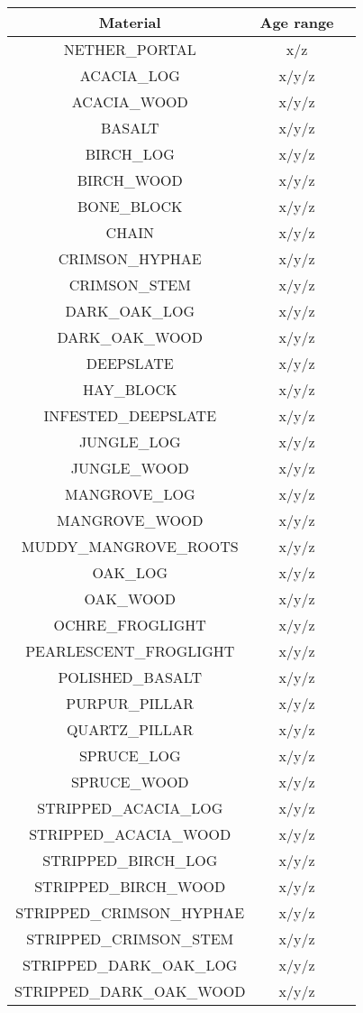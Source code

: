 \documentclass[11pt]{article}
\begin{document}
\begin{longtable}{ |c|c|c| }
	\hline
	Material & Age range \\
	\hline
	\endhead
	NETHER\_PORTAL & x/z \\
	ACACIA\_LOG & x/y/z \\
	ACACIA\_WOOD & x/y/z \\
	BASALT & x/y/z \\
	BIRCH\_LOG & x/y/z \\
	BIRCH\_WOOD & x/y/z \\
	BONE\_BLOCK & x/y/z \\
	CHAIN & x/y/z \\
	CRIMSON\_HYPHAE & x/y/z \\
	CRIMSON\_STEM & x/y/z \\
	DARK\_OAK\_LOG & x/y/z \\
	DARK\_OAK\_WOOD & x/y/z \\
	DEEPSLATE & x/y/z \\
	HAY\_BLOCK & x/y/z \\
	INFESTED\_DEEPSLATE & x/y/z \\
	JUNGLE\_LOG & x/y/z \\
	JUNGLE\_WOOD & x/y/z \\
	MANGROVE\_LOG & x/y/z \\
	MANGROVE\_WOOD & x/y/z \\
	MUDDY\_MANGROVE\_ROOTS & x/y/z \\
	OAK\_LOG & x/y/z \\
	OAK\_WOOD & x/y/z \\
	OCHRE\_FROGLIGHT & x/y/z \\
	PEARLESCENT\_FROGLIGHT & x/y/z \\
	POLISHED\_BASALT & x/y/z \\
	PURPUR\_PILLAR & x/y/z \\
	QUARTZ\_PILLAR & x/y/z \\
	SPRUCE\_LOG & x/y/z \\
	SPRUCE\_WOOD & x/y/z \\
	STRIPPED\_ACACIA\_LOG & x/y/z \\
	STRIPPED\_ACACIA\_WOOD & x/y/z \\
	STRIPPED\_BIRCH\_LOG & x/y/z \\
	STRIPPED\_BIRCH\_WOOD & x/y/z \\
	STRIPPED\_CRIMSON\_HYPHAE & x/y/z \\
	STRIPPED\_CRIMSON\_STEM & x/y/z \\
	STRIPPED\_DARK\_OAK\_LOG & x/y/z \\
	STRIPPED\_DARK\_OAK\_WOOD & x/y/z \\

\end{longtable}
\end{document}

